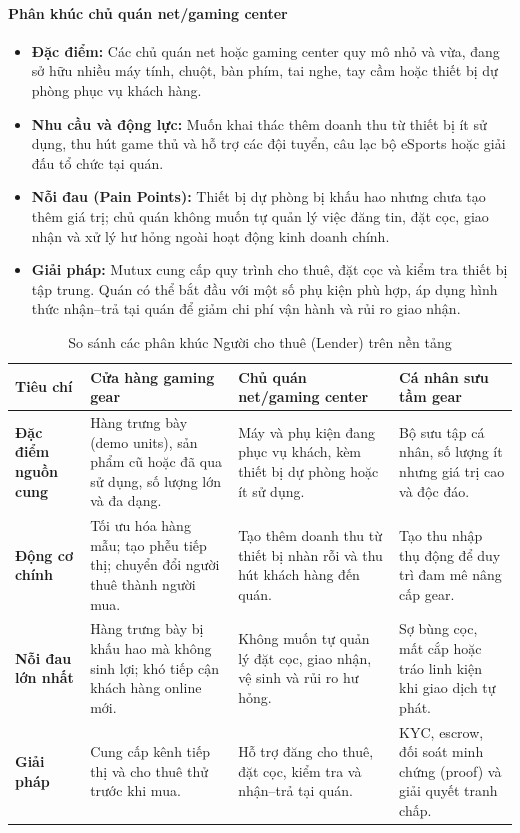 \paragraph{Phân khúc chủ quán net/gaming center}
\begin{itemize}
    \item \textbf{Đặc điểm:} Các chủ quán net hoặc gaming center quy mô nhỏ và vừa, đang sở hữu nhiều máy tính, chuột, bàn phím, tai nghe, tay cầm hoặc thiết bị dự phòng phục vụ khách hàng.
    \item \textbf{Nhu cầu và động lực:} Muốn khai thác thêm doanh thu từ thiết bị ít sử dụng, thu hút game thủ và hỗ trợ các đội tuyển, câu lạc bộ eSports hoặc giải đấu tổ chức tại quán.
    \item \textbf{Nỗi đau (Pain Points):} Thiết bị dự phòng bị khấu hao nhưng chưa tạo thêm giá trị; chủ quán không muốn tự quản lý việc đăng tin, đặt cọc, giao nhận và xử lý hư hỏng ngoài hoạt động kinh doanh chính.
    \item \textbf{Giải pháp:} Mutux cung cấp quy trình cho thuê, đặt cọc và kiểm tra thiết bị tập trung. Quán có thể bắt đầu với một số phụ kiện phù hợp, áp dụng hình thức nhận--trả tại quán để giảm chi phí vận hành và rủi ro giao nhận.
\end{itemize}


\begin{table}[H]
    \centering
    \caption{So sánh các phân khúc Người cho thuê (Lender) trên nền tảng}
    \label{tab:lender-icp}
    \small
    \begin{tabular}{p{3.2cm}p{3.2cm}p{3.2cm}p{3.2cm}}
        \toprule
        \textbf{Tiêu chí} & \textbf{Cửa hàng gaming gear} & \textbf{Chủ quán net/gaming center} & \textbf{Cá nhân sưu tầm gear} \\
        \midrule
        \textbf{Đặc điểm nguồn cung} & Hàng trưng bày (demo units), sản phẩm cũ hoặc đã qua sử dụng, số lượng lớn và đa dạng. & Máy và phụ kiện đang phục vụ khách, kèm thiết bị dự phòng hoặc ít sử dụng. & Bộ sưu tập cá nhân, số lượng ít nhưng giá trị cao và độc đáo. \\
        \textbf{Động cơ chính} & Tối ưu hóa hàng mẫu; tạo phễu tiếp thị; chuyển đổi người thuê thành người mua. & Tạo thêm doanh thu từ thiết bị nhàn rỗi và thu hút khách hàng đến quán. & Tạo thu nhập thụ động để duy trì đam mê nâng cấp gear. \\
        \textbf{Nỗi đau lớn nhất} & Hàng trưng bày bị khấu hao mà không sinh lợi; khó tiếp cận khách hàng online mới. & Không muốn tự quản lý đặt cọc, giao nhận, vệ sinh và rủi ro hư hỏng. & Sợ bùng cọc, mất cắp hoặc tráo linh kiện khi giao dịch tự phát. \\
        \textbf{Giải pháp \projectname{}} & Cung cấp kênh tiếp thị và cho thuê thử trước khi mua. & Hỗ trợ đăng cho thuê, đặt cọc, kiểm tra và nhận--trả tại quán. & KYC, escrow, đối soát minh chứng (proof) và giải quyết tranh chấp. \\
        \bottomrule
    \end{tabular}
\end{table}

